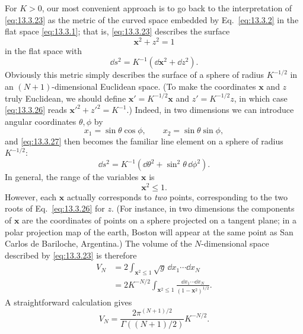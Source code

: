 For \(K>0\), our most convenient approach is to go back to the interpretation
of \eqref{eq:13.3.23} as the metric of the curved space embedded by
Eq.~\eqref{eq:13.3.2} in the flat space \eqref{eq:13.3.1}; that is,
\eqref{eq:13.3.23} describes the surface
\begin{equation}
  \mathbf{x}^2+z^2=1
  \tag{13.3.26}\label{eq:13.3.26}
\end{equation}
in the flat space with
\begin{equation}
  \dd s^2
  =
  K^{-1}\left(\dd\mathbf{x}^2+\dd z^2\right).
  \tag{13.3.27}\label{eq:13.3.27}
\end{equation}
Obviously this metric simply describes the surface of a sphere of radius
\(K^{-1/2}\) in an \((N+1)\)-dimensional Euclidean space. (To make the
coordinates \(\mathbf{x}\) and \(z\) truly Euclidean, we should define
\(\mathbf{x}'=K^{-1/2}\mathbf{x}\) and \(z'=K^{-1/2}z\), in which case
\eqref{eq:13.3.26} reads
\(\mathbf{x}'^2+z'^2=K^{-1}\).) Indeed, in two dimensions we can introduce
angular coordinates \(\theta,\phi\) by
\[
  x_1=\sin\theta\cos\phi,
  \qquad
  x_2=\sin\theta\sin\phi,
\]
and \eqref{eq:13.3.27} then becomes the familiar line element on a sphere
of radius \(K^{-1/2}\):
\begin{equation}
  \dd s^2
  =
  K^{-1}
  \left(
    \dd\theta^2+\sin^2\theta\,\dd\phi^2
  \right).
  \tag{13.3.28}\label{eq:13.3.28}
\end{equation}
In general, the range of the variables \(\mathbf{x}\) is
\[
  \mathbf{x}^2\leq1.
\]
However, each \(\mathbf{x}\) actually corresponds to \emph{two} points,
corresponding to the two roots of Eq.~\eqref{eq:13.3.26} for \(z\).
(For instance, in two dimensions the components of \(\mathbf{x}\) are the
coordinates of points on a sphere projected on a tangent plane; in a polar
projection map of the earth, Boston will appear at the same point as San
Carlos de Bariloche, Argentina.) The volume of the \(N\)-dimensional space
described by \eqref{eq:13.3.23} is therefore
\[
  \begin{aligned}
  V_N
  &=
  2\int_{\mathbf{x}^2\leq1}
  \sqrt{g}\,\dd x_1\cdots\dd x_N
  \\
  &=
  2K^{-N/2}
  \int_{\mathbf{x}^2\leq1}
  \frac{\dd x_1\cdots\dd x_N}
       {(1-\mathbf{x}^2)^{1/2}}.
  \end{aligned}
\]
A straightforward calculation gives
\begin{equation}
  V_N
  =
  \frac{2\pi^{(N+1)/2}}
       {\Gamma\!\left((N+1)/2\right)}
  K^{-N/2}.
  \tag{13.3.29}\label{eq:13.3.29}
\end{equation}
